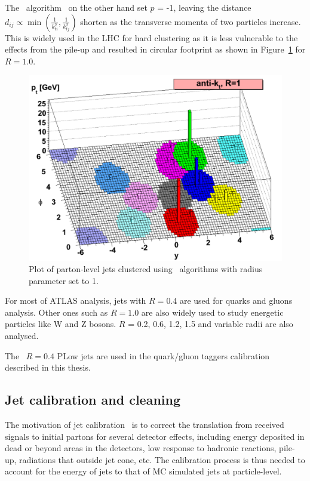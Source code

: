 The  \antikt~algorithm~\cite{Cacciari:2008gp} on the other hand set $p$ = -1, leaving the distance $d_{i j} \propto \min \left(\frac{1}{k_{t i}^2}, \frac{1}{k_{t j}^2}\right)$ shorten as the transverse momenta of two particles increase. This is widely used in the LHC for hard clustering as it is less vulnerable to the effects from the pile-up and resulted in circular footprint as shown in Figure~\ref{Fig.kt} for $R = 1.0$.

\begin{figure}[htb] 
	\centering  
	\includegraphics[width=12cm]{./fig/kt.png}	\caption{Plot of parton-level jets clustered using  \antikt~algorithms with radius parameter set to 1.}
	\label{Fig.kt}
\end{figure}

For most of ATLAS analysis, jets with $R = 0.4$ are used for quarks and gluons analysis. Other ones such as $R = 1.0$ are also widely used to study energetic particles like W and Z bosons. $R$ = 0.2, 0.6, 1.2, 1.5 and variable radii are also analysed.

The \antikt~$R = 0.4$ PLow jets are used in the quark/gluon taggers calibration described in this thesis.



\subsection{Jet calibration and cleaning}
\label{sec:4.2}

The motivation of jet calibration~\cite{ATLAS:2020cli,PhysRevD.96.072002} is to correct the translation from received signals to initial partons for several detector effects, including energy deposited in dead or beyond areas in the detectors, low response to hadronic reactions, pile-up, radiations that outside jet cone, etc. The calibration process is thus needed to account for the energy of jets to that of MC simulated jets at particle-level.

